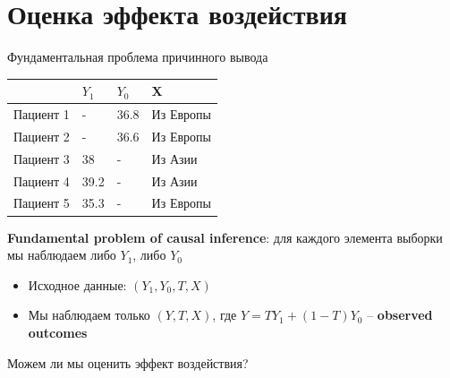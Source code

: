 \section{Оценка эффекта воздействия}


\begin{frame}{Фундаментальная проблема причинного вывода}

\begin{table}[]
\begin{tabular}{l|l|l||l}
&$Y_1$ & $Y_0$ & X \\
\hline
Пациент 1 & - & 36.8 &  Из Европы \\
Пациент 2 & - & 36.6 &  Из Европы \\
Пациент 3 &38   & - & Из Азии  \\
Пациент 4 &39.2 & - &  Из Азии \\
Пациент 5 &35.3 & - & Из Европы 
\end{tabular}
\end{table}

\textbf{Fundamental problem of causal inference}: для каждого элемента выборки мы наблюдаем либо $Y_1$, либо $Y_0$

\begin{itemize}
    \item Исходное данные: $(Y_1, Y_0, T, X)$
    \item Мы наблюдаем только $(Y, T, X)$, где $Y = TY_1 + (1-T)Y_0$ -- \textbf{observed outcomes}
\end{itemize}

Можем ли мы оценить эффект воздействия?

\end{frame}

